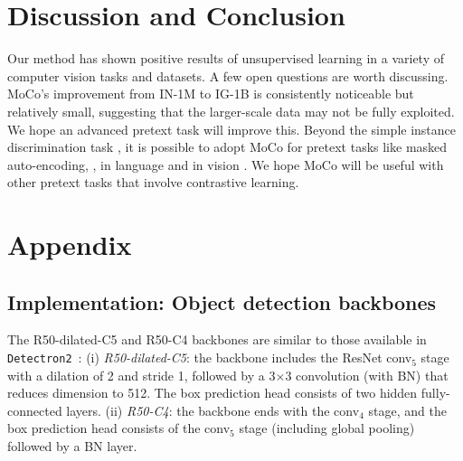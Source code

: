 \documentclass[10pt,twocolumn,letterpaper]{article}
\begin{document}
\section{Discussion and Conclusion}

Our method has shown positive results of unsupervised learning in a variety of computer vision tasks and datasets. A few open questions are worth discussing.
MoCo's improvement from IN-1M to IG-1B is consistently noticeable but relatively small, suggesting that the larger-scale data may not be fully exploited. We hope an advanced pretext task will improve this.
Beyond the simple instance discrimination task \cite{Wu2018a}, it is possible to adopt MoCo for pretext tasks like masked auto-encoding, \eg, in language \cite{Devlin2019} and in vision \cite{Oord2018}. We hope MoCo will be useful with other pretext tasks that involve contrastive learning.

%
%

\appendix
\section{Appendix}

\renewcommand\thefigure{\thesection.\arabic{figure}}
\renewcommand\thetable{\thesection.\arabic{table}}
\setcounter{figure}{0} 
\setcounter{table}{0} 

\setcounter{table}{0}
\renewcommand{\thetable}{A.\arabic{table}}

\subsection{Implementation: Object detection backbones}
The R50-dilated-C5 and R50-C4 backbones are similar to those available in \texttt{Detectron2}~\cite{Wu2019}: (i) \emph{R50-dilated-C5}: the backbone includes the ResNet conv$_\text{5}$ stage with a dilation of 2 and stride 1, followed by a 3$\times$3 convolution (with BN) that reduces dimension to 512. The box prediction head consists of two hidden fully-connected layers. (ii) \emph{R50-C4}: the backbone ends with the conv$_\text{4}$ stage, and the box prediction head consists of the conv$_\text{5}$ stage (including global pooling) followed by a BN layer.
\end{document}
